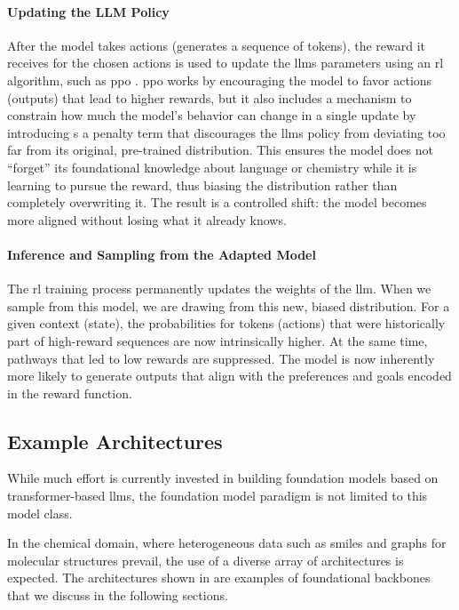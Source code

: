 \paragraph{Updating the LLM Policy} 
After the model takes actions (generates a sequence of tokens), the reward it receives for the chosen actions is used to update the \glspl{llm} parameters using an \gls{rl} algorithm, such as \gls{ppo} \autocite{schulman2017proximal}.
\gls{ppo} works by encouraging the model to favor actions (outputs) that lead to higher rewards, but it also includes a mechanism to constrain how much the model's behavior can change in a single update by introducing s a penalty term that discourages the \glspl{llm} policy from deviating too far from its original, pre-trained distribution. 
This ensures the model does not \enquote{forget} its foundational knowledge about language or chemistry while it is learning to pursue the reward, thus biasing the distribution rather than completely overwriting it. 
The result is a controlled shift: the model becomes more aligned without losing what it already knows.


\paragraph{Inference and Sampling from the Adapted Model}

The \gls{rl} training process permanently updates the weights of the \gls{llm}. 
When we sample from this model, we are drawing from this new, biased distribution. 
For a given context (state), the probabilities for tokens (actions) that were historically part of high-reward sequences are now intrinsically higher. 
At the same time, pathways that led to low rewards are suppressed. 
The model is now inherently more likely to generate outputs that align with the preferences and goals encoded in the reward function.

\subsection{Example Architectures} \label{sec:example_architectures}
While much effort is currently invested in building foundation models based on transformer-based \glspl{llm}, the foundation model paradigm is not limited to this model class.

In the chemical domain, where heterogeneous data such as \gls{smiles} and graphs for molecular structures prevail, the use of a diverse array of architectures is expected.
The architectures shown in  are examples of foundational backbones that we discuss in the following sections.


